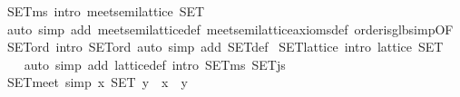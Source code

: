 \begin{isabellebody}
\endisatagproof
{\isafoldproof}%
%
\isadelimproof
\isanewline
%
\endisadelimproof
\isanewline
{}\isamarkupfalse%
\ SET{}ms\ {}intro{}{}\ {}meet{}semilattice\ SET{}\isanewline
%
\isadelimproof
\ \ %
\endisadelimproof
%
\isatagproof
{}\isamarkupfalse%
\ {}auto\ simp\ add{}\ meet{}semilattice{}def\ meet{}semilattice{}axioms{}def\ order{}is{}glb{}simp{}OF\ SET{}ord{}\ intro{}\ SET{}ord{}\ {}auto\ simp\ add{}\ SET{}def{}%
\endisatagproof
{\isafoldproof}%
%
\isadelimproof
\isanewline
%
\endisadelimproof
\isanewline
{}\isamarkupfalse%
\ SET{}lattice\ {}intro{}{}\ {}lattice\ SET{}\isanewline
%
\isadelimproof
\ \ %
\endisadelimproof
%
\isatagproof
{}\isamarkupfalse%
\ {}auto\ simp\ add{}\ lattice{}def\ intro{}\ SET{}ms\ SET{}js{}%
\endisatagproof
{\isafoldproof}%
%
\isadelimproof
\isanewline
%
\endisadelimproof
\isanewline
{}\isamarkupfalse%
\ SET{}meet\ {}simp{}{}\ {}x\ {}\isactrlbsub SET\isactrlesub \ y\ {}\ x\ {}\ y{}\isanewline

\end{isabellebody}
